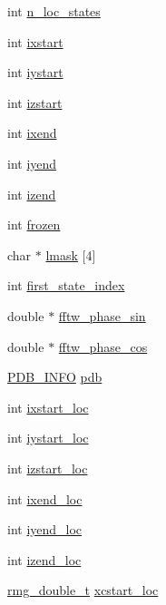 \begin{DoxyCompactItemize}
\begin{tabbing}
\end{tabbing}\item 
int \hyperlink{struct_i_o_n_a76a436900c11bbe43958ca825f9882d9}{n\-\_\-loc\-\_\-states}
\item 
int \hyperlink{struct_i_o_n_a04adcb3910851138c4f12c3ce841a171}{ixstart}
\item 
int \hyperlink{struct_i_o_n_a40931107fdbbfb32d41da3d800ddeb40}{iystart}
\item 
int \hyperlink{struct_i_o_n_aea3a1f82d1f1b2e9f9389fac28df7ceb}{izstart}
\item 
int \hyperlink{struct_i_o_n_a7c33e0c9f82cde36dedf93e5b4020dc5}{ixend}
\item 
int \hyperlink{struct_i_o_n_a7a7518715e62364038d928e8feb662bb}{iyend}
\item 
int \hyperlink{struct_i_o_n_aded9873a3c718f3751bfe8b95d9dde20}{izend}
\item 
int \hyperlink{struct_i_o_n_ace4b6bb81c0955b83bbe7bae08f5e742}{frozen}
\item 
char $\ast$ \hyperlink{struct_i_o_n_afd06a717c0645d8c3f3b167d4e4b96a6}{lmask} \mbox{[}4\mbox{]}
\item 
int \hyperlink{struct_i_o_n_a92009586bc766b32152187a1e1915c2c}{first\-\_\-state\-\_\-index}
\item 
double $\ast$ \hyperlink{struct_i_o_n_a44e270a2a5ebe76b9bdf8c3c49c98590}{fftw\-\_\-phase\-\_\-sin}
\item 
double $\ast$ \hyperlink{struct_i_o_n_a6795be4aa977f37e747a1012c680cdc3}{fftw\-\_\-phase\-\_\-cos}
\item 
\hyperlink{struct_p_d_b___i_n_f_o}{P\-D\-B\-\_\-\-I\-N\-F\-O} \hyperlink{struct_i_o_n_a73d7a10366e72d9e9d2eb62d0bcfa698}{pdb}
\item 
int \hyperlink{struct_i_o_n_ae27757e1196f9513743791af4150e7d0}{ixstart\-\_\-loc}
\item 
int \hyperlink{struct_i_o_n_a5393a52576beacf6484eb2d366c0d7f0}{iystart\-\_\-loc}
\item 
int \hyperlink{struct_i_o_n_a679558cab86f00ce24013c904a4bbbd4}{izstart\-\_\-loc}
\item 
int \hyperlink{struct_i_o_n_a80e9b67928b5ef2739c4d09559940f64}{ixend\-\_\-loc}
\item 
int \hyperlink{struct_i_o_n_a528bfceb937ba60f92ddbe74e2cf0a07}{iyend\-\_\-loc}
\item 
int \hyperlink{struct_i_o_n_aaddbfe8f58d2de0531ba698ab64313eb}{izend\-\_\-loc}
\item 
\hyperlink{rmgtypes_8h_aaa16921c14f121c56eaa42390a340db8}{rmg\-\_\-double\-\_\-t} \hyperlink{struct_i_o_n_a0b2ba71ff1691839df1ce06588ef1a27}{xcstart\-\_\-loc}

\end{DoxyCompactItemize}
